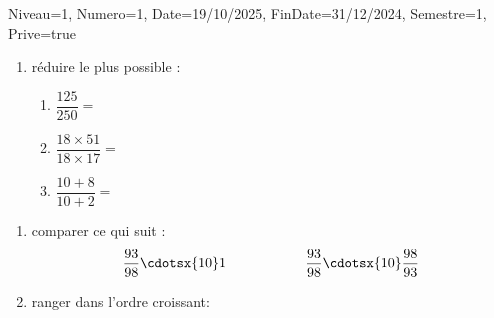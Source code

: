 \documentclass[a4paper,12pt]{article}
\begin{document}
\begin{Maquette}[DM]{Niveau=1, Numero=1, Date=19/10/2025, FinDate=31/12/2024, Semestre=1, Prive=true}
\begin{exercice}
\begin{enumerate}[font=\bfseries]
		\item réduire le plus possible :
\begin{enumerate}[label={\alph* =}]
\item $\dfrac{125}{250}=$\anserline[1]
\item $\dfrac{18\times 51}{18 \times 17}=$\anserline[1]
\item $\dfrac{10+8}{10+2}=$\anserline[1]
\end{enumerate}
\end{enumerate}		
\end{exercice}

\begin{exercice}
\begin{enumerate}[font=\bfseries]
		\item comparer ce qui suit  :	
$$\dfrac{93}{98}\cdotsx{10} 1 \hspace{1cm}   \hspace{1cm}
\dfrac{93}{98}\cdotsx{10}\dfrac{98}{93}$$

\item ranger dans l'ordre croissant:
\end{enumerate}

\end{exercice}

\end{Maquette}
\end{document}
